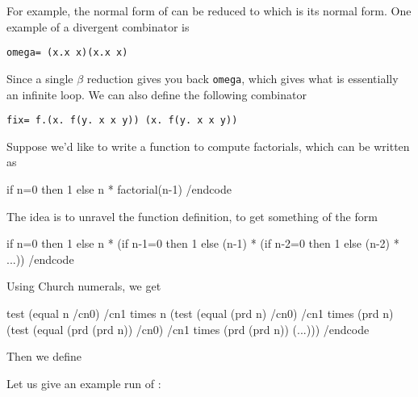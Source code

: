 \edefn

For example, the normal form of  can be reduced to  which is its normal form.
One example of a divergent combinator is

\smallskip
\centerline{\tt omega= (\lambda x.x x)(\lambda x.x x)}

Since a single $\beta$ reduction gives you back {\tt omega}, which gives what is essentially an infinite loop.
We can also define the following combinator

\smallskip
\centerline{\tt fix= \lambda f.(\lambda x. f(\lambda y. x x y)) (\lambda x. f(\lambda y. x x y))}

Suppose we'd like to write a function to compute factorials, which can be written as

\begincode
if n=0 then 1
else n * factorial(n-1)
/endcode

The idea is to unravel the function definition, to get something of the form

\begincode
if n=0 then 1
else n * (if n-1=0 then 1
          else (n-1) * (if n-2=0 then 1
                        else (n-2) * ...))
/endcode

Using Church numerals, we get

\begincode
test (equal n /cn0) 
    /cn1
    times n (test (equal (prd n) /cn0)
            /cn1
            times (prd n) (test (equal (prd (prd n)) /cn0)
                           /cn1
                           times (prd (prd n)) (...)))
/endcode

Then we define


Let us give an example run of :

\medskip
{}

